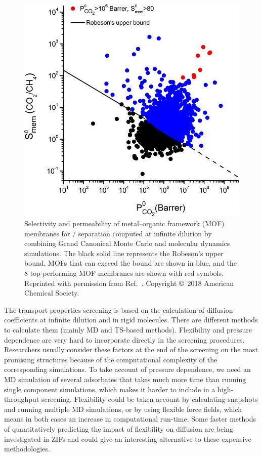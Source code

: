 \documentclass[main.tex]{subfiles}
\begin{document}
\begin{figure}[ht]
\centering
  \includegraphics[width=0.5\linewidth]{figures/1-screening/Altintas_2018.jpeg}
  \caption{Selectivity and permeability of metal--organic framework (MOF) membranes for / separation computed at infinite dilution by combining Grand Canonical Monte Carlo and molecular dynamics simulations.\autocite{Altintas_2018} The black solid line represents the Robeson's upper bound.\autocite{robeson1991correlation, Robeson_2008} MOFs that can exceed the bound are shown in blue, and the 8 top-performing MOF membranes are shown with red symbols. Reprinted with permission from Ref.~\cite{Altintas_2018}. Copyright \copyright\  2018 American Chemical Society.}\label{fgr:Altintas_2018}
\end{figure}

The transport properties screening is based on the calculation of diffusion coefficients at infinite dilution and in rigid molecules. There are different methods to calculate them (mainly MD and TS-based methods). Flexibility and pressure dependence are very hard to incorporate directly in the screening procedures. Researchers usually consider these factors at the end of the screening on the most promising structures because of the computational complexity of the corresponding simulations. {To take account of} pressure dependence, {we need} an MD simulation of several adsorbates { that takes much more time than running single component simulations},\autocite{Keskin_2007, Keskin_2009} which {makes it harder to include in a} high-throughput screening. Flexibility could be taken account by calculating snapshots and running multiple MD simulations, or by using flexible force fields, which means in both cases an increase in computational run-time. Some faster methods of quantitatively predicting the impact of flexibility on diffusion are being investigated in ZIFs and could give an interesting alternative to these expensive methodologies.\autocite{Han_2020}
\end{document}
